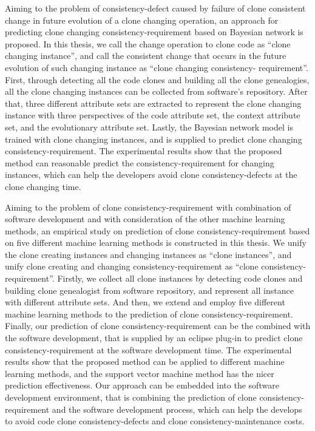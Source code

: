 {%
Aiming to the problem of consistency-defect caused by failure of clone consistent change in future evolution of a clone changing operation,  an approach for predicting clone changing consistency-requirement based on Bayesian network is proposed. In this thesis, we call the change operation to clone code as ``clone changing instance'', and call the consistent change that occurs in the future evolution of such changing instance as ``clone changing consistency- requirement''. First, through detecting all the code clones and building all the clone genealogies, all the clone changing instances can be collected  from software's repository. After that, three different attribute sets are extracted to represent the clone changing instance with three perspectives of the code attribute set, the context attribute set, and the evolutionary attribute set. Lastly, the Bayesian network model is trained with clone changing instances, and  is supplied to predict clone changing consistency-requirement. The experimental results show that the proposed method can reasonable predict the consistency-requirement for changing instances, which can help the developers avoid clone consistency-defects at the clone changing time.


Aiming to the problem of clone consistency-requirement with combination of software development and with consideration of the other machine learning methods, an empirical study on prediction of clone consistency-requirement based on five different machine learning methods is constructed in this thesis. We unify the clone creating instances and changing instances as ``clone instances'', and unify clone creating and changing consistency-requirement as ``clone consistency-requirement''. Firstly, we collect all clone instances by detecting code clones and building clone genealogist from software repository, and represent all instance with different attribute sets. And then, we extend and employ five different machine learning methods to the prediction of clone consistency-requirement. Finally, our prediction of clone consistency-requirement can be the combined with the software development, that is supplied by an eclipse plug-in to predict clone consistency-requirement at the software development time. The experimental results show that the proposed method can be applied to different machine learning methods, and the support vector machine method has the nicer prediction effectiveness. Our approach can be embedded into the software development environment, that is combining the prediction of clone consistency-requirement and the software development process, which can help the develops to avoid code clone consistency-defects and clone consistency-maintenance costs. %

}
